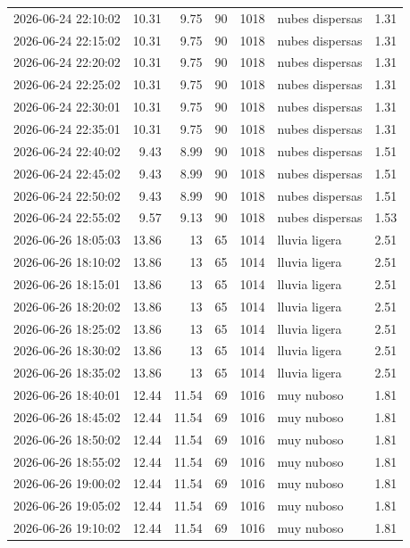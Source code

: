\documentclass{article}
\begin{document}
\begin{enumerate}
\begin{enumerate}
\begin{table}[htbp]
\begin{tabular}{lrrrrlr}
2026-06-24 22:10:02 & 10.31 & 9.75 & 90 & 1018 & nubes dispersas & 1.31\\
2026-06-24 22:15:02 & 10.31 & 9.75 & 90 & 1018 & nubes dispersas & 1.31\\
2026-06-24 22:20:02 & 10.31 & 9.75 & 90 & 1018 & nubes dispersas & 1.31\\
2026-06-24 22:25:02 & 10.31 & 9.75 & 90 & 1018 & nubes dispersas & 1.31\\
2026-06-24 22:30:01 & 10.31 & 9.75 & 90 & 1018 & nubes dispersas & 1.31\\
2026-06-24 22:35:01 & 10.31 & 9.75 & 90 & 1018 & nubes dispersas & 1.31\\
2026-06-24 22:40:02 & 9.43 & 8.99 & 90 & 1018 & nubes dispersas & 1.51\\
2026-06-24 22:45:02 & 9.43 & 8.99 & 90 & 1018 & nubes dispersas & 1.51\\
2026-06-24 22:50:02 & 9.43 & 8.99 & 90 & 1018 & nubes dispersas & 1.51\\
2026-06-24 22:55:02 & 9.57 & 9.13 & 90 & 1018 & nubes dispersas & 1.53\\
2026-06-26 18:05:03 & 13.86 & 13 & 65 & 1014 & lluvia ligera & 2.51\\
2026-06-26 18:10:02 & 13.86 & 13 & 65 & 1014 & lluvia ligera & 2.51\\
2026-06-26 18:15:01 & 13.86 & 13 & 65 & 1014 & lluvia ligera & 2.51\\
2026-06-26 18:20:02 & 13.86 & 13 & 65 & 1014 & lluvia ligera & 2.51\\
2026-06-26 18:25:02 & 13.86 & 13 & 65 & 1014 & lluvia ligera & 2.51\\
2026-06-26 18:30:02 & 13.86 & 13 & 65 & 1014 & lluvia ligera & 2.51\\
2026-06-26 18:35:02 & 13.86 & 13 & 65 & 1014 & lluvia ligera & 2.51\\
2026-06-26 18:40:01 & 12.44 & 11.54 & 69 & 1016 & muy nuboso & 1.81\\
2026-06-26 18:45:02 & 12.44 & 11.54 & 69 & 1016 & muy nuboso & 1.81\\
2026-06-26 18:50:02 & 12.44 & 11.54 & 69 & 1016 & muy nuboso & 1.81\\
2026-06-26 18:55:02 & 12.44 & 11.54 & 69 & 1016 & muy nuboso & 1.81\\
2026-06-26 19:00:02 & 12.44 & 11.54 & 69 & 1016 & muy nuboso & 1.81\\
2026-06-26 19:05:02 & 12.44 & 11.54 & 69 & 1016 & muy nuboso & 1.81\\
2026-06-26 19:10:02 & 12.44 & 11.54 & 69 & 1016 & muy nuboso & 1.81\\

\end{tabular}
\end{table}
\end{enumerate}
\end{enumerate}
\end{document}
